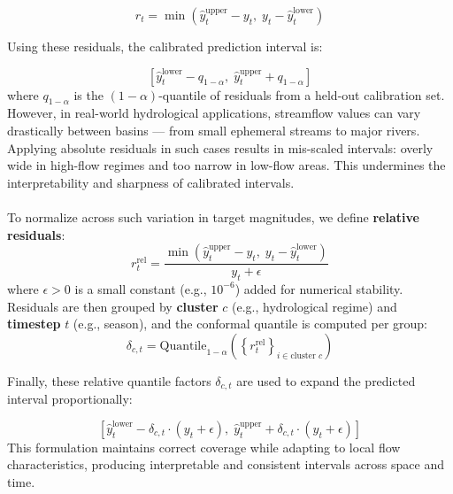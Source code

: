 \documentclass[ruler]{CUP-JNL-EDS}%
\begin{document}
\begin{equation}
r_t = \min\left( \hat{y}_t^{\text{upper}} - y_t,\; y_t - \hat{y}_t^{\text{lower}} \right)
\label{eq:absolute_residual}
\end{equation}

\noindent Using these residuals, the calibrated prediction interval is:

\begin{equation}
\left[ \hat{y}_t^{\text{lower}} - q_{1-\alpha},\; \hat{y}_t^{\text{upper}} + q_{1-\alpha} \right]
\label{eq:standard_interval}
\end{equation}
where $q_{1-\alpha}$ is the $(1 - \alpha)$-quantile of residuals from a held-out calibration set.
\\
\noindent However, in real-world hydrological applications, streamflow values can vary drastically 
between basins — from small ephemeral streams to major rivers. Applying absolute residuals in such 
cases results in mis-scaled intervals: overly wide in high-flow regimes and too narrow in low-flow areas. 
This undermines the interpretability and sharpness of calibrated intervals.
\\ \\ 
To normalize across such variation in target magnitudes, we define \textbf{relative residuals}:
\begin{equation}
r_t^{\text{rel}} = \frac{\min\left( \hat{y}_t^{\text{upper}} - y_t,\; y_t - \hat{y}_t^{\text{lower}} \right)}{y_t + \epsilon}
\label{eq:relative_residual}
\end{equation}
where $\epsilon > 0$ is a small constant (e.g., $10^{-6}$) added for numerical stability.
\\
Residuals are then grouped by \textbf{cluster} $c$ (e.g., hydrological regime) and \textbf{timestep} 
$t$ (e.g., season), and the conformal quantile is computed per group:
\begin{equation}
\delta_{c, t} = \text{Quantile}_{1 - \alpha} \left( \left\{ r_t^{\text{rel}} \right\}_{i \in \text{cluster } c} \right)
\label{eq:cluster_quantile}
\end{equation}

\noindent Finally, these relative quantile factors $\delta_{c, t}$ are used to expand the predicted interval proportionally:

\begin{equation}
\left[
\hat{y}_t^{\text{lower}} - \delta_{c, t} \cdot (y_t + \epsilon),\;
\hat{y}_t^{\text{upper}} + \delta_{c, t} \cdot (y_t + \epsilon)
\right]
\label{eq:relative_interval}
\end{equation}
\noindent This formulation maintains correct coverage while adapting to local flow characteristics, producing interpretable and consistent intervals across space and time.
\end{document}
